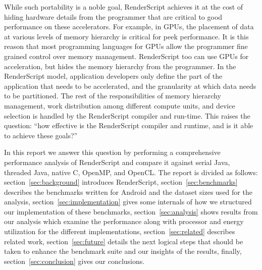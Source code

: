 While such portability is a noble goal, RenderScript achieves it at the cost of
hiding hardware details from the programmer that are critical to good
performance on these accelerators. For example, in GPUs, the placement of data at
various levels of memory hierarchy is critical for peek performance.  It is this
reason that most programming languages for GPUs allow the programmer fine grained
control over memory management. RenderScript too can use GPUs for acceleration,
but hides the memory hierarchy from the programmer. In the
RenderScript model, application developers only define the part of the
application that needs to be accelerated, and the granularity at which data
needs to be partitioned. The rest of the responsibilities of memory
hierarchy management, work distribution among different compute units, and device selection
is handled by the RenderScript compiler and run-time. 
This raises the question: ``how
effective is the RenderScript compiler and runtime, and is it able to achieve these goals?''

In this report we answer this question 
by performing a comprehensive performance analysis of RenderScript and compare
it against 
serial Java, threaded Java, native C, OpenMP, and OpenCL.
The report is divided as follows: section~\ref{sec:background} introduces 
RenderScript, section~\ref{sec:benchmarks} describes the benchmarks written for
Android and the dataset sizes
used for the analysis,
section~\ref{sec:implementation} gives some internals of how we structured our
implementation of these benchmarks,
section~\ref{sec:analysis} shows results from our analysis which
examine the performance along with processor and energy utilization for the
different implementations,
section~\ref{sec:related} describes related work,
section~\ref{sec:future} details the next logical steps that should be taken to
enhance the benchmark suite and our insights of the results,
finally, section~\ref{sec:conclusion} gives our conclusions.
